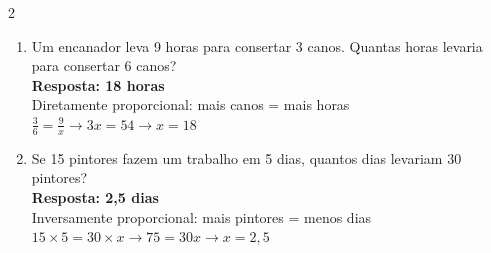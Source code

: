 \documentclass[11pt]{article}
\begin{document}
\begin{multicols}{2}
\begin{enumerate}[leftmargin=*, itemsep=15pt]
\item Um encanador leva 9 horas para consertar 3 canos. Quantas horas levaria para consertar 6 canos? \\
\textbf{Resposta: 18 horas} \\
Diretamente proporcional: mais canos = mais horas \\
$\frac{3}{6} = \frac{9}{x} \rightarrow 3x = 54 \rightarrow x = 18$

\item Se 15 pintores fazem um trabalho em 5 dias, quantos dias levariam 30 pintores? \\
\textbf{Resposta: 2,5 dias} \\
Inversamente proporcional: mais pintores = menos dias \\
$15 \times 5 = 30 \times x \rightarrow 75 = 30x \rightarrow x = 2,5$

\end{enumerate}

\end{multicols}
\end{document}
